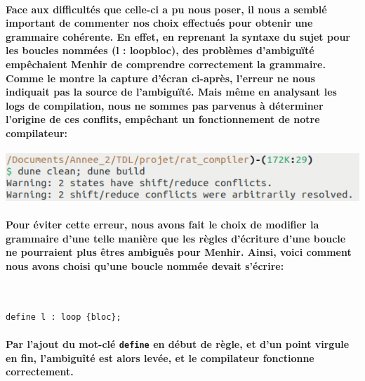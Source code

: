 \documentclass[french]{article}
\begin{document}
\paragraph{Face aux difficultés que celle-ci a pu nous poser, il nous a semblé important de commenter nos choix effectués pour obtenir une grammaire cohérente.
En effet, en reprenant la syntaxe du sujet pour les boucles nommées (l : loop{bloc}), des problèmes d'ambiguïté empêchaient Menhir de comprendre correctement la grammaire.
Comme le montre la capture d'écran ci-après, l'erreur ne nous indiquait pas la source de l'ambiguïté. Mais même en analysant les logs de compilation, nous ne sommes
pas parvenus à déterminer l'origine de ces conflits, empêchant un fonctionnement de notre compilateur:\\}
\begin{center}
        \includegraphics[scale=0.5]{shift_reduce.png}
\end{center}
\paragraph{Pour éviter cette erreur, nous avons fait le choix de modifier la grammaire d'une telle manière que les règles d'écriture d'une boucle ne pourraient
plus êtres ambiguês pour Menhir. Ainsi, voici comment nous avons choisi qu'une boucle nommée devait s'écrire: }
\,
\begin{lstlisting}[language=ratcode]
        define l : loop {bloc};
\end{lstlisting}
\paragraph{Par l'ajout du mot-clé \texttt{define} en début de règle, et d'un point virgule en fin, l'ambiguîté est alors levée, et le compilateur fonctionne 
correctement.}
\end{document}
